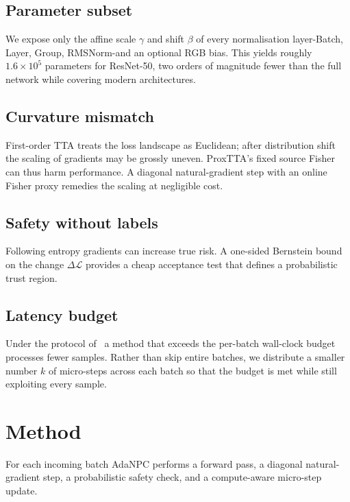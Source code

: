 \documentclass{article} %
\begin{document}
\subsection{Parameter subset}
We expose only the affine scale \(\gamma\) and shift \(\beta\) of every normalisation layer-Batch, Layer, Group, RMSNorm-and an optional RGB bias. This yields roughly \(1.6\times10^5\) parameters for ResNet-50, two orders of magnitude fewer than the full network while covering modern architectures.
\subsection{Curvature mismatch}
First-order TTA treats the loss landscape as Euclidean; after distribution shift the scaling of gradients may be grossly uneven. ProxTTA’s fixed source Fisher can thus harm performance. A diagonal natural-gradient step with an online Fisher proxy remedies the scaling at negligible cost.
\subsection{Safety without labels}
Following entropy gradients can increase true risk. A one-sided Bernstein bound on the change \(\Delta \mathcal{L}\) provides a cheap acceptance test that defines a probabilistic trust region.
\subsection{Latency budget}
Under the protocol of~\cite{alfarra-2023-evaluation} a method that exceeds the per-batch wall-clock budget processes fewer samples. Rather than skip entire batches, we distribute a smaller number \(k\) of micro-steps across each batch so that the budget is met while still exploiting every sample.

\section{Method}\label{sec:method}
For each incoming batch AdaNPC performs a forward pass, a diagonal natural-gradient step, a probabilistic safety check, and a compute-aware micro-step update.
\end{document}
